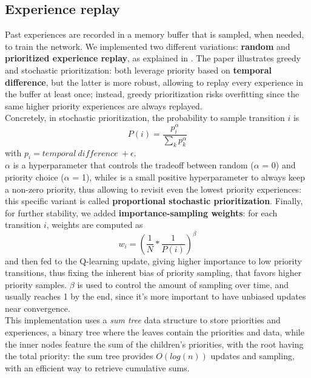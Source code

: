 \subsection{Experience replay}
Past experiences are recorded in a memory buffer that is sampled, when needed, to train the network. We implemented two different variations: \textbf{random} and \textbf{prioritized experience replay}, as explained in \cite{priority}. The paper illustrates greedy and stochastic prioritization: both leverage priority based on \textbf{temporal difference}, but the latter is more robust, allowing to replay every experience in the buffer at least once; instead, greedy prioritization risks overfitting since the same higher priority experiences are always replayed. \\
\noindent
Concretely, in stochastic prioritization, the probability to sample transition $i$ is $$P(i) = \frac{p_i^\alpha}{\sum_k p_k^\alpha}$$ with $p_i = temporal\ difference\ + \epsilon$. \\
$\alpha$ is a hyperparameter that controls the tradeoff between random ($\alpha$ = 0) and priority choice ($\alpha$ = 1), while$\epsilon$ is a small positive hyperparameter to always keep a non-zero priority, thus allowing to revisit even the lowest priority experiences: this specific variant is called \textbf{proportional stochastic prioritization}. Finally, for further stability, we added \textbf{importance-sampling weights}: for each transition $i$, weights are computed as $$w_i = (\frac{1}{N} * \frac{1}{P(i)})^\beta$$ and then fed to the Q-learning update, giving higher importance to low priority transitions, thus fixing the inherent bias of priority sampling, that favors higher priority samples. $\beta$ is used to control the amount of sampling over time, and usually reaches 1 by the end, since it's more important to have unbiased updates near convergence.\\
\noindent
This implementation uses a \textit{sum tree} data structure to store priorities and experiences, a binary tree where the leaves contain the priorities and data, while the inner nodes feature the sum of the children's priorities, with the root having the total priority: the sum tree provides $O(log(n))$ updates and sampling, with an efficient way to retrieve cumulative sums.
\noindent

